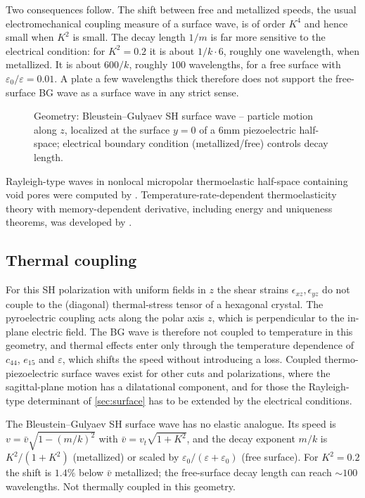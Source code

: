 Two consequences follow. The shift between free and metallized speeds, the usual electromechanical coupling measure of a surface wave, is of order $K^4$ and hence small when $K^2$ is small. The decay length $1/m$ is far more sensitive to the electrical condition: for $K^2=0.2$ it is about $1/k\cdot6$, roughly one wavelength, when metallized. It is about $600/k$, roughly $100$ wavelengths, for a free surface with $\varepsilon_0/\varepsilon=0.01$. A plate a few wavelengths thick therefore does not support the free-surface BG wave as a surface wave in any strict sense.

\begin{figure}[t!]\centering\small

\caption{Geometry: Bleustein--Gulyaev SH surface wave -- particle motion along $z$, localized at the surface $y=0$ of a 6mm piezoelectric half-space; electrical boundary condition (metallized/free) controls decay length.}\label{fig:bg-geo}
\end{figure}

Rayleigh-type waves in nonlocal micropolar thermoelastic half-space containing void pores were computed by \citep{Kumar2024b}. Temperature-rate-dependent thermoelasticity theory with memory-dependent derivative, including energy and uniqueness theorems, was developed by \citep{Singh2020d}.

\subsection{Thermal coupling}
For this SH polarization with uniform fields in $z$ the shear strains $\epsilon_{xz},\epsilon_{yz}$ do not couple to the (diagonal) thermal-stress tensor of a hexagonal crystal. The pyroelectric coupling acts along the polar axis $z$, which is perpendicular to the in-plane electric field. The BG wave is therefore not coupled to temperature in this geometry, and thermal effects enter only through the temperature dependence of $c_{44}$, $e_{15}$ and $\varepsilon$, which shifts the speed without introducing a loss. Coupled thermo-piezoelectric surface waves exist for other cuts and polarizations, where the sagittal-plane motion has a dilatational component, and for those the Rayleigh-type determinant of \cref{sec:surface} has to be extended by the electrical conditions.

\begin{summarybox}[Summary]
The Bleustein--Gulyaev SH surface wave has no elastic analogue. Its speed is $v=\bar v\sqrt{1-(m/k)^2}$ with $\bar v=v_t\sqrt{1+K^2}$, and the decay exponent $m/k$ is $K^2/(1+K^2)$ (metallized) or scaled by $\varepsilon_0/(\varepsilon+\varepsilon_0)$ (free surface). For $K^2=0.2$ the shift is $1.4\%$ below $\bar v$ metallized; the free-surface decay length can reach $\sim100$ wavelengths. Not thermally coupled in this geometry.
\end{summarybox}
